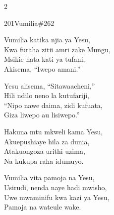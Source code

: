 \begin{multicols}{2}
\begin{hymn}{201}{Vumilia}{\#262}
\begin{stanza}
Vumilia katika njia ya Yesu,\\
Kwa furaha zitii amri zake Mungu,\\
Msikie hata kati ya tufani,\\
Akisema, ``Iwepo amani.''
\end{stanza}
\begin{stanza}
Yesu alisema, ``Sitawaacheni,''\\
Hili ndilo neno la kutufariji,\\
``Nipo nawe daima, zidi kufuata,\\
Giza liwepo au lisiwepo.''
\end{stanza}
\begin{stanza}
Hakuna mtu mkweli kama Yesu,\\
Akuepushiaye hila za dunia,\\
Atakuongoza urithi uzima,\\
Na kukupa raha idumuyo.
\end{stanza}
\begin{stanza}
Vumilia vita pamoja na Yesu,\\
Usirudi, nenda naye hadi mwisho,\\
Uwe mwaminifu kwa kazi ya Yesu,\\
Pamoja na wateule wake.
\end{stanza}
\end{hymn}


\end{multicols}
